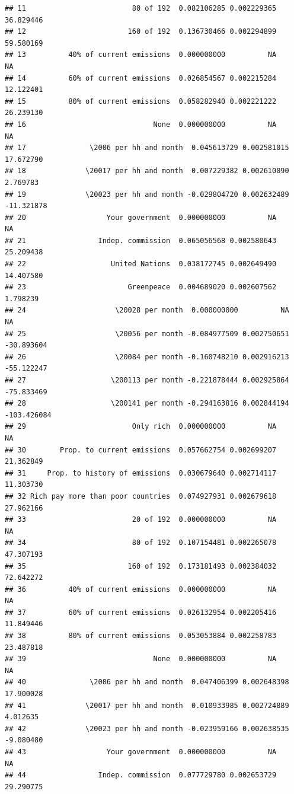 \documentclass[a4paper,12pt]{article}\usepackage[]{graphicx}\usepackage[]{color}
\makeatletter
\newenvironment{kframe}{%
 \def\at@end@of@kframe{}%
 \ifinner\ifhmode%
  \def\at@end@of@kframe{\end{minipage}}%
  \begin{minipage}{\columnwidth}%
 \fi\fi%
 \def\FrameCommand##1{\hskip\@totalleftmargin \hskip-\fboxsep
 \colorbox{shadecolor}{##1}\hskip-\fboxsep
     \hskip-\linewidth \hskip-\@totalleftmargin \hskip\columnwidth}%
 \MakeFramed {\advance\hsize-\width
   \@totalleftmargin\z@ \linewidth\hsize
   \@setminipage}}%
 {\par\unskip\endMakeFramed%
 \at@end@of@kframe}
\newenvironment{knitrout}{}{} %
\makeatother
\begin{document}
\begin{knitrout}
\begin{kframe}
\begin{verbatim}
## 11                         80 of 192  0.082106285 0.002229365   36.829446
## 12                        160 of 192  0.136730466 0.002294899   59.580169
## 13          40% of current emissions  0.000000000          NA          NA
## 14          60% of current emissions  0.026854567 0.002215284   12.122401
## 15          80% of current emissions  0.058282940 0.002221222   26.239130
## 16                              None  0.000000000          NA          NA
## 17               \2006 per hh and month  0.045613729 0.002581015   17.672790
## 18              \20017 per hh and month  0.007229382 0.002610090    2.769783
## 19              \20023 per hh and month -0.029804720 0.002632489  -11.321878
## 20                   Your government  0.000000000          NA          NA
## 21                 Indep. commission  0.065056568 0.002580643   25.209438
## 22                    United Nations  0.038172745 0.002649490   14.407580
## 23                        Greenpeace  0.004689020 0.002607562    1.798239
## 24                     \20028 per month  0.000000000          NA          NA
## 25                     \20056 per month -0.084977509 0.002750651  -30.893604
## 26                     \20084 per month -0.160748210 0.002916213  -55.122247
## 27                    \200113 per month -0.221878444 0.002925864  -75.833469
## 28                    \200141 per month -0.294163816 0.002844194 -103.426084
## 29                         Only rich  0.000000000          NA          NA
## 30        Prop. to current emissions  0.057662754 0.002699207   21.362849
## 31     Prop. to history of emissions  0.030679640 0.002714117   11.303730
## 32 Rich pay more than poor countries  0.074927931 0.002679618   27.962166
## 33                         20 of 192  0.000000000          NA          NA
## 34                         80 of 192  0.107154481 0.002265078   47.307193
## 35                        160 of 192  0.173181493 0.002384032   72.642272
## 36          40% of current emissions  0.000000000          NA          NA
## 37          60% of current emissions  0.026132954 0.002205416   11.849446
## 38          80% of current emissions  0.053053884 0.002258783   23.487818
## 39                              None  0.000000000          NA          NA
## 40               \2006 per hh and month  0.047406399 0.002648398   17.900028
## 41              \20017 per hh and month  0.010933985 0.002724889    4.012635
## 42              \20023 per hh and month -0.023959166 0.002638535   -9.080480
## 43                   Your government  0.000000000          NA          NA
## 44                 Indep. commission  0.077729780 0.002653729   29.290775

\end{verbatim}
\end{kframe}
\end{knitrout}
\end{document}
